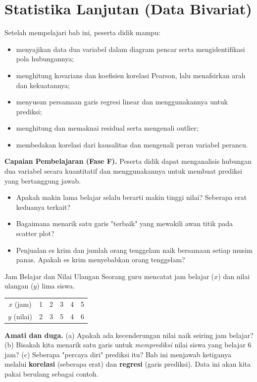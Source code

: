 \documentclass[11pt,a4paper]{report}
\theoremstyle{gaya}
\begin{document}
\chapter{Statistika Lanjutan (Data Bivariat)}
\begin{tujuan}
Setelah mempelajari bab ini, peserta didik mampu:
\begin{itemize}[leftmargin=*,topsep=2pt]
  \item menyajikan data dua variabel dalam diagram pencar serta mengidentifikasi pola hubungannya;
  \item menghitung kovarians dan koefisien korelasi Pearson, lalu menafsirkan arah dan kekuatannya;
  \item menyusun persamaan garis regresi linear dan menggunakannya untuk prediksi;
  \item menghitung dan memaknai residual serta mengenali outlier;
  \item membedakan korelasi dari kausalitas dan mengenali peran variabel perancu.
\end{itemize}
\textbf{Capaian Pembelajaran (Fase F).} Peserta didik dapat menganalisis hubungan dua variabel secara kuantitatif dan menggunakannya untuk membuat prediksi yang bertanggung jawab.
\end{tujuan}

\begin{pemantik}
\begin{itemize}[leftmargin=*,topsep=2pt]
  \item Apakah makin lama belajar selalu berarti makin tinggi nilai? Seberapa erat keduanya terkait?
  \item Bagaimana menarik satu garis "terbaik" yang mewakili awan titik pada scatter plot?
  \item Penjualan es krim dan jumlah orang tenggelam naik bersamaan setiap musim panas. Apakah es krim menyebabkan orang tenggelam?
\end{itemize}
\end{pemantik}

\begin{studikasus}{Jam Belajar dan Nilai Ulangan}
Seorang guru mencatat jam belajar ($x$) dan nilai ulangan ($y$) lima siswa.
\begin{center}
\begin{tabular}{c|ccccc}
\toprule
$x$ (jam) & 1 & 2 & 3 & 4 & 5 \\
$y$ (nilai) & 2 & 3 & 5 & 4 & 6 \\
\bottomrule
\end{tabular}
\end{center}
\textbf{Amati dan duga.} (a) Apakah ada kecenderungan nilai naik seiring jam belajar? (b) Bisakah kita menarik satu garis untuk \emph{memprediksi} nilai siswa yang belajar $6$ jam? (c) Seberapa "percaya diri" prediksi itu? Bab ini menjawab ketiganya melalui \textbf{korelasi} (seberapa erat) dan \textbf{regresi} (garis prediksi). Data ini akan kita pakai berulang sebagai contoh.
\end{studikasus}
\end{document}
